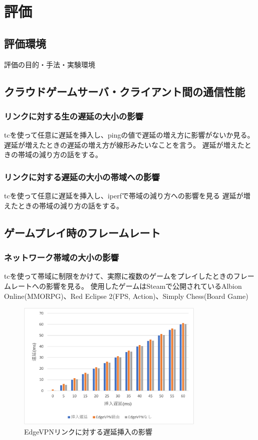 \section{評価}

\subsection{評価環境}
評価の目的・手法・実験環境

\subsection{クラウドゲームサーバ・クライアント間の通信性能}

\subsubsection{リンクに対する生の遅延の大小の影響}
tcを使って任意に遅延を挿入し、pingの値で遅延の増え方に影響がないか見る。
遅延が増えたときの遅延の増え方が線形みたいなことを言う。
遅延が増えたときの帯域の減り方の話をする。

\subsubsection{リンクに対する遅延の大小の帯域への影響}
tcを使って任意に遅延を挿入し、iperfで帯域の減り方への影響を見る
遅延が増えたときの帯域の減り方の話をする。

\subsection{ゲームプレイ時のフレームレート}

\subsubsection{ネットワーク帯域の大小の影響}
tcを使って帯域に制限をかけて、実際に複数のゲームをプレイしたときのフレームレートへの影響を見る。
使用したゲームはSteamで公開されているAlbion Online(MMORPG)、Red Eclipse 2(FPS, Action)、Simply Chess(Board Game)


\begin{figure}[t]
    \centering
    \includegraphics[width=0.8\textwidth,keepaspectratio,clip]{img/graph_ratency.pdf}
    \caption{EdgeVPNリンクに対する遅延挿入の影響}
    \label{fig:ratency}
\end{figure}

